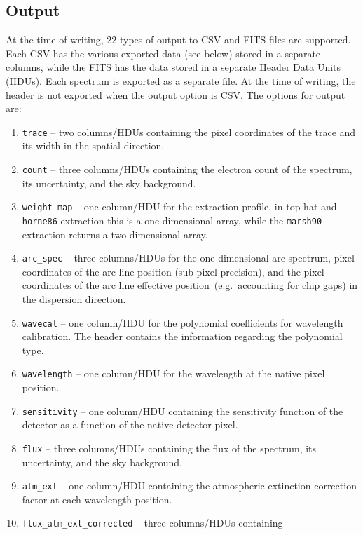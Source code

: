 \documentclass[linenumbers, twocolumn]{aastex631}
\begin{document}
\subsection{Output}
At the time of writing, 22 types of output to CSV and FITS files are supported.
Each CSV has the various exported data (see below) stored in a separate columns, while the FITS has
the data stored in a separate Header Data Units (HDUs). Each spectrum is exported
as a separate file. At the time of writing, the header is not exported when the
output option is CSV. The options for output are:

\begin{enumerate}
    \item \texttt{trace} -- two columns/HDUs containing the pixel coordinates
    of the trace and its width in the spatial direction.
    \item \texttt{count} -- three columns/HDUs containing the electron count
    of the spectrum, its uncertainty, and the sky background.
    \item \texttt{weight\_map} -- one column/HDU for the extraction profile,
    in top hat and \texttt{horne86} extraction this is a one dimensional array,
    while the \texttt{marsh90} extraction returns a two dimensional array.
    \item \texttt{arc\_spec} -- three columns/HDUs for the one-dimensional arc
    spectrum, pixel coordinates of the arc line position (sub-pixel precision),
    and the pixel coordinates of the arc line effective position~(e.g.\ accounting for chip gaps) in the dispersion direction.
    \item \texttt{wavecal} -- one column/HDU for the polynomial coefficients
    for wavelength calibration. The header contains the information regarding the
    polynomial type.
    \item \texttt{wavelength} -- one column/HDU for the wavelength at the
    native pixel position.
    \item \texttt{sensitivity} -- one column/HDU containing the sensitivity
    function of the detector as a function of the native detector pixel.
    \item \texttt{flux} -- three columns/HDUs containing the
    flux of the spectrum, its uncertainty, and the sky background.
    \item \texttt{atm\_ext} -- one column/HDU containing the atmospheric
    extinction correction factor at each wavelength position.
    \item \texttt{flux\_atm\_ext\_corrected} -- three columns/HDUs containing

\end{enumerate}
\end{document}
